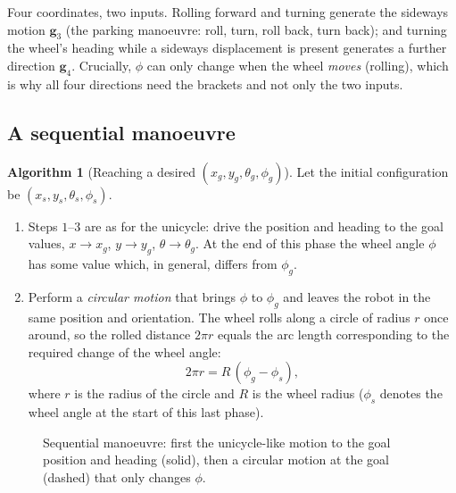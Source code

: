\documentclass[11pt,a4paper]{article}
\theoremstyle{definition}
\newtheorem{algorithm}[definition]{Algorithm}
\theoremstyle{plain}
\begin{document}
\begin{intuition}
Four coordinates, two inputs. Rolling forward and turning generate the sideways motion $\bm g_3$ (the parking manoeuvre: roll, turn, roll back, turn back); and turning the wheel's heading while a sideways displacement is present generates a further direction $\bm g_4$. Crucially, $\phi$ can only change when the wheel \emph{moves} (rolling), which is why all four directions need the brackets and not only the two inputs.
\end{intuition}

\subsection{A sequential manoeuvre}

\begin{algorithm}[Reaching a desired $(x_g,y_g,\theta_g,\phi_g)$]\label{alg:rollwheel}
Let the initial configuration be $(x_s,y_s,\theta_s,\phi_s)$.
\begin{enumerate}[nosep]
 \item Steps $1$--$3$ are as for the unicycle: drive the position and heading to the goal values, $x\to x_g$, $y\to y_g$, $\theta\to\theta_g$. At the end of this phase the wheel angle $\phi$ has some value which, in general, differs from $\phi_g$.
 \item Perform a \emph{circular motion} that brings $\phi$ to $\phi_g$ and leaves the robot in the same position and orientation. The wheel rolls along a circle of radius $r$ once around, so the rolled distance $2\pi r$ equals the arc length corresponding to the required change of the wheel angle:
 \[
   2\pi r=R\,(\phi_g-\phi_s),
 \]
 where $r$ is the radius of the circle and $R$ is the wheel radius ($\phi_s$ denotes the wheel angle at the start of this last phase).
\end{enumerate}
\end{algorithm}

\begin{figure}[ht]
\centering
{}
\caption{Sequential manoeuvre: first the unicycle-like motion to the goal position and heading (solid), then a circular motion at the goal (dashed) that only changes $\phi$.}
\end{figure}
\end{document}

